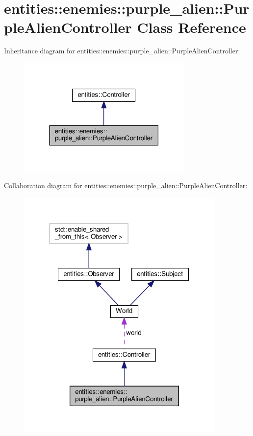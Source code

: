\hypertarget{classentities_1_1enemies_1_1purple__alien_1_1PurpleAlienController}{}\section{entities\+:\+:enemies\+:\+:purple\+\_\+alien\+:\+:Purple\+Alien\+Controller Class Reference}
\label{classentities_1_1enemies_1_1purple__alien_1_1PurpleAlienController}


Inheritance diagram for entities\+:\+:enemies\+:\+:purple\+\_\+alien\+:\+:Purple\+Alien\+Controller\+:\nopagebreak
\begin{figure}[H]
\begin{center}
\leavevmode
\includegraphics[width=246pt]{classentities_1_1enemies_1_1purple__alien_1_1PurpleAlienController__inherit__graph}
\end{center}
\end{figure}


Collaboration diagram for entities\+:\+:enemies\+:\+:purple\+\_\+alien\+:\+:Purple\+Alien\+Controller\+:\nopagebreak
\begin{figure}[H]
\begin{center}
\leavevmode
\includegraphics[width=293pt]{classentities_1_1enemies_1_1purple__alien_1_1PurpleAlienController__coll__graph}
\end{center}
\end{figure}
